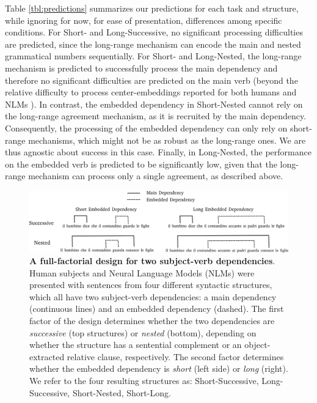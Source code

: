 Table \ref{tbl:predictions} summarizes our predictions for each task and structure, while ignoring for now, for ease of presentation, differences among specific conditions. For Short- and Long-Successive, no significant processing difficulties are predicted, since the long-range mechanism can encode the main and nested grammatical numbers sequentially. For Short- and Long-Nested, the long-range mechanism is predicted to successfully process the main dependency and therefore no significant difficulties are predicted on the main verb (beyond the relative difficulty to process center-embeddings reported for both humans \citep{traxler2002processing} and NLMs \citep{marvin2018targeted}). In contrast, the embedded dependency in Short-Nested cannot rely on the long-range agreement mechanism, as it is recruited by the main dependency. Consequently, the processing of the embedded dependency can only rely on short-range mechanisms, which might not be as robust as the long-range ones. We are thus agnostic about success in this case. Finally, in Long-Nested, the performance on the embedded verb is predicted to be significantly low, given that the long-range mechanism can process only a single agreement, as described above. 




\begin{figure}
    \centering
    \includegraphics[width=\textwidth]{figures/design.png}
    \caption{\textbf{A full-factorial design for two subject-verb dependencies}. Human subjects and Neural Language Models (NLMs) were presented with sentences from four different syntactic structures, which all have two subject-verb dependencies: a main dependency (continuous lines) and an embedded dependency (dashed). The first factor of the design determines whether the two dependencies are \textit{successive} (top structures) or \textit{nested} (bottom), depending on whether the structure has a sentential complement or an object-extracted relative clause, respectively. The second factor determines whether the embedded dependency is \textit{short} (left side) or \textit{long} (right). We refer to the four resulting structures as: Short-Successive, Long-Successive, Short-Nested, Short-Long.}
    \label{fig:design}
\end{figure}

